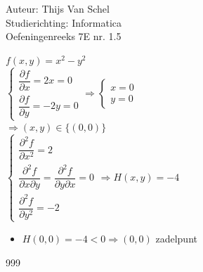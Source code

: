 \documentclass[a4paper]{article}
\begin{document}
  
\noindent \large Auteur: Thijs Van Schel \\
\noindent \large Studierichting: Informatica\\
\noindent \large Oefeningenreeks 7E nr. 1.5\\

\medskip

\normalsize

$f(x,y) = x^2 - y^2$ \\

$
\left\{ 
\begin{array}{l} 
\dfrac{\partial f}{\partial x} = 2x = 0 \\ 
\dfrac{\partial f}{\partial y} = -2y = 0 
\end{array} 
\right.
\Rightarrow
\left\{ 
\begin{array}{l} 
x = 0 \\ 
y = 0 
\end{array} 
\right.
$ \\

$\Rightarrow (x,y) \in \{(0, 0)\}$ \\

$
\left\{ 
\begin{array}{l} 
\dfrac{\partial^2 f}{\partial x^2} = 2 \\ 
\dfrac{\partial^2 f}{\partial x \partial y} = \dfrac{\partial^2 f}{\partial y \partial x} = 0 \\
\dfrac{\partial^2 f}{\partial y^2} = -2
\end{array} 
\right.
\Rightarrow H(x,y) = -4
$ \\

\begin{itemize}
    \item $H(0, 0) = -4 < 0 \Rightarrow (0, 0)$ zadelpunt
\end{itemize}

\begin{thebibliography}{999}
\end{thebibliography}
\end{document}
